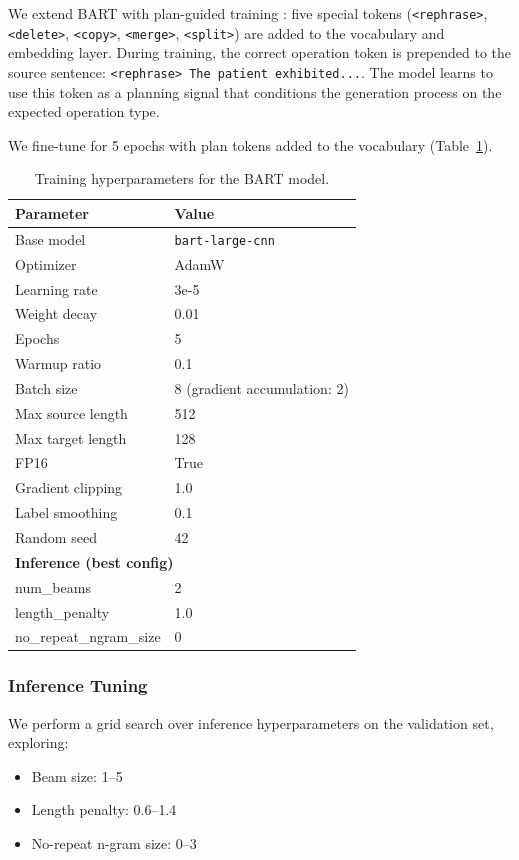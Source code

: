 \documentclass{ceurart}
\begin{document}
We extend BART with plan-guided training \cite{martin2022muss}: five special tokens (\texttt{<rephrase>}, \texttt{<delete>}, \texttt{<copy>}, \texttt{<merge>}, \texttt{<split>}) are added to the vocabulary and embedding layer.
During training, the correct operation token is prepended to the source sentence: \texttt{<rephrase> The patient exhibited...}.
The model learns to use this token as a planning signal that conditions the generation process on the expected operation type.

We fine-tune for 5 epochs with plan tokens added to the vocabulary (Table~\ref{tab:hyperparams}).

\begin{table}[t]
\centering
\caption{Training hyperparameters for the BART model.}
\label{tab:hyperparams}
\begin{tabular}{ll}
\toprule
Parameter & Value \\
\midrule
Base model & \texttt{bart-large-cnn} \\
Optimizer & AdamW \\
Learning rate & 3e-5 \\
Weight decay & 0.01 \\
Epochs & 5 \\
Warmup ratio & 0.1 \\
Batch size & 8 (gradient accumulation: 2) \\
Max source length & 512 \\
Max target length & 128 \\
FP16 & True \\
Gradient clipping & 1.0 \\
Label smoothing & 0.1 \\
Random seed & 42 \\
\midrule
\multicolumn{2}{l}{\textbf{Inference (best config)}} \\
num\_beams & 2 \\
length\_penalty & 1.0 \\
no\_repeat\_ngram\_size & 0 \\
\bottomrule
\end{tabular}
\end{table}

\subsubsection{Inference Tuning}

We perform a grid search over inference hyperparameters on the validation set, exploring:
\begin{itemize}
    \item Beam size: 1--5
    \item Length penalty: 0.6--1.4
    \item No-repeat n-gram size: 0--3
\end{itemize}
\end{document}
